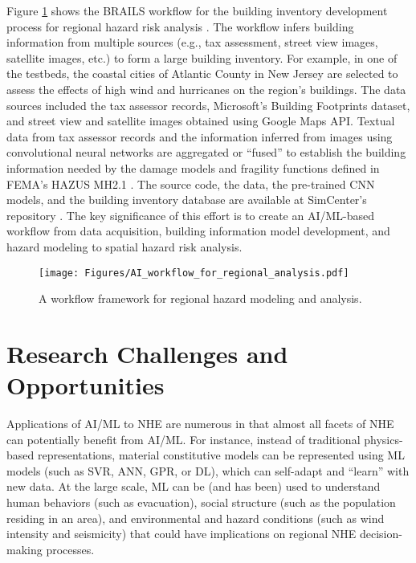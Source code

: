 Figure \ref{fig:AI_workflow_for_regional_analysis} shows the BRAILS workflow for the building inventory development process for regional hazard risk analysis \citep{wang2020flood}. The workflow infers building information from multiple sources (e.g., tax assessment, street view images, satellite images, etc.) to form a large building inventory. For example, in one of the testbeds, the coastal cities of Atlantic County in New Jersey are selected to assess the effects of high wind and hurricanes on the region's buildings. The data sources included the tax assessor records, Microsoft's Building Footprints dataset, and street view and satellite images obtained using Google Maps API. Textual data from tax assessor records and the information inferred from images using convolutional neural networks are aggregated or ``fused'' to establish the building information needed by the damage models and fragility functions defined in FEMA's HAZUS MH2.1 \citep{fema2011earthquaketechnical}. The source code, the data, the pre-trained CNN models, and the building inventory database are available at SimCenter's repository \citep{yu2019building}. The key significance of this effort is to create an AI/ML-based workflow from data acquisition, building information model development, and hazard modeling to spatial hazard risk analysis. 

\begin{figure}[htb]
    \centering
    \texttt{[image: Figures/AI\_workflow\_for\_regional\_analysis.pdf]}
    \caption{A workflow framework for regional hazard modeling and analysis.}
    \label{fig:AI_workflow_for_regional_analysis}
\end{figure}

\section{Research Challenges and Opportunities}
\label{sec:ai_gaps}

Applications of AI/ML to NHE are numerous in that almost all facets of NHE can potentially benefit from AI/ML. For instance, instead of traditional physics-based representations, material constitutive models can be represented using ML models (such as SVR, ANN, GPR, or DL), which can self-adapt and ``learn'' with new data. At the large scale, ML can be (and has been) used to understand human behaviors (such as evacuation), social structure (such as the population residing in an area), and environmental and hazard conditions (such as wind intensity and seismicity) that could have implications on regional NHE decision-making processes.

